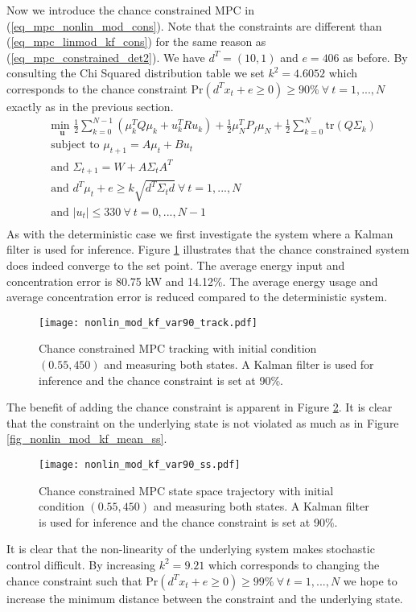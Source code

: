 Now we introduce the chance constrained MPC in (\ref{eq_mpc_nonlin_mod_cons}). Note that the constraints are different than (\ref{eq_mpc_linmod_kf_cons}) for the same reason as (\ref{eq_mpc_constrained_det2}). We have $d^T = (10, 1)$ and $e=406$ as before. By consulting the Chi Squared distribution table we set $k^2 = 4.6052$ which corresponds to the chance constraint $\text{Pr}(d^Tx_t + e \geq 0) \geq 90\% ~\forall ~t=1,...,N$ exactly as in the previous section.
\begin{equation}
\begin{aligned}
&\underset{\mathbf{u}}{\text{min }} \frac{1}{2}\sum_{k=0}^{N-1} \left( \mu_k^TQ\mu_k + u_k^TRu_k \right) + \frac{1}{2}\mu_N^TP_f\mu_N + \frac{1}{2}\sum_{k=0}^N \text{tr}(Q\Sigma_k) \\
& \text{subject to } \mu_{t+1}=A\mu_t + Bu_t \\
& \text{and } \Sigma_{t+1} = W+A\Sigma_t A^T \\
& \text{and } d^T\mu_t + e \geq k\sqrt{d^T \Sigma_t d} ~\forall ~t=1,...,N\\
& \text{and } |u_t| \leq 330 ~\forall ~t=0,...,N-1\\
\end{aligned}
\label{eq_mpc_nonlin_mod_cons}
\end{equation}
As with the deterministic case we first investigate the system where a Kalman filter is used for inference. Figure \ref{fig_nonlin_mod_kf_var90_track} illustrates that the chance constrained system does indeed converge to the set point. The average energy input and concentration error is 80.75 kW and 14.12\%. The average energy usage and average concentration error is reduced compared to the deterministic system. 
\begin{figure}[H] 
\centering
\texttt{[image: nonlin\_mod\_kf\_var90\_track.pdf]}
\caption{Chance constrained MPC tracking with initial condition $(0.55, 450)$ and measuring both states. A Kalman filter is used for inference and the chance constraint is set at 90\%.}
\label{fig_nonlin_mod_kf_var90_track}
\end{figure}
The benefit of adding the chance constraint is apparent in Figure \ref{fig_nonlin_mod_kf_var90_ss}. It is clear that the constraint on the underlying state is not violated as much as in Figure \ref{fig_nonlin_mod_kf_mean_ss}. 
\begin{figure}[H] 
\centering
\texttt{[image: nonlin\_mod\_kf\_var90\_ss.pdf]}
\caption{Chance constrained MPC state space trajectory with initial condition $(0.55, 450)$ and measuring both states. A Kalman filter is used for inference and the chance constraint is set at 90\%.}
\label{fig_nonlin_mod_kf_var90_ss}
\end{figure}
It is clear that the non-linearity of the underlying system makes stochastic control difficult. By increasing $k^2=9.21$ which corresponds to changing the chance constraint such that $\text{Pr}(d^Tx_t + e \geq 0) \geq 99\% ~\forall ~t=1,...,N$ we hope to increase the minimum distance between the constraint and the underlying state.

